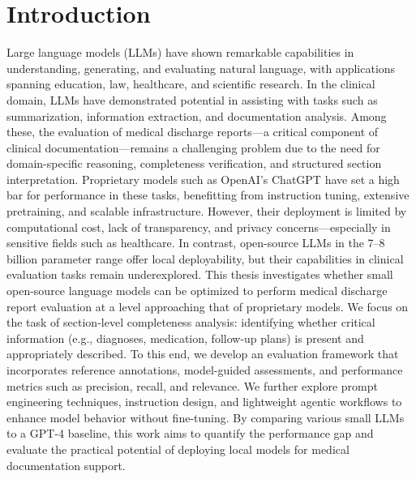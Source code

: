 \section{Introduction}
Large language models (LLMs) have shown remarkable capabilities in understanding, generating, and evaluating natural language, with applications spanning education, law, healthcare, and scientific research. In the clinical domain, LLMs have demonstrated potential in assisting with tasks such as summarization, information extraction, and documentation analysis. Among these, the evaluation of medical discharge reports—a critical component of clinical documentation—remains a challenging problem due to the need for domain-specific reasoning, completeness verification, and structured section interpretation.
Proprietary models such as OpenAI’s ChatGPT have set a high bar for performance in these tasks, benefitting from instruction tuning, extensive pretraining, and scalable infrastructure. However, their deployment is limited by computational cost, lack of transparency, and privacy concerns—especially in sensitive fields such as healthcare. In contrast, open-source LLMs in the 7–8 billion parameter range offer local deployability, but their capabilities in clinical evaluation tasks remain underexplored.
This thesis investigates whether small open-source language models can be optimized to perform medical discharge report evaluation at a level approaching that of proprietary models. We focus on the task of section-level completeness analysis: identifying whether critical information (e.g., diagnoses, medication, follow-up plans) is present and appropriately described. To this end, we develop an evaluation framework that incorporates reference annotations, model-guided assessments, and performance metrics such as precision, recall, and relevance.
We further explore prompt engineering techniques, instruction design, and lightweight agentic workflows to enhance model behavior without fine-tuning. By comparing various small LLMs to a GPT-4 baseline, this work aims to quantify the performance gap and evaluate the practical potential of deploying local models for medical documentation support.
